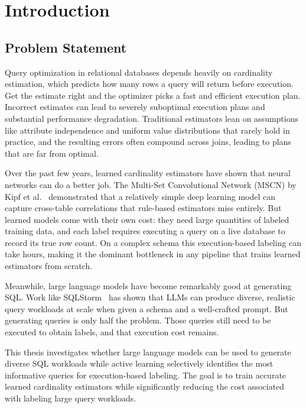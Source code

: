 
\chapter{Introduction}
\label{chap:introduction}
\pagestyle{plain}
\setcounter{page}{1}

\section{Problem Statement}

Query optimization in relational databases depends heavily on cardinality estimation, which predicts how many rows a query will return before execution. Get the estimate right and the optimizer picks a fast and efficient execution plan. Incorrect estimates can lead to severely suboptimal execution plans and substantial performance degradation. Traditional estimators lean on assumptions like attribute independence and uniform value distributions that rarely hold in practice, and the resulting errors often compound across joins, leading to plans that are far from optimal.

Over the past few years, learned cardinality estimators have shown that neural networks can do a better job. The Multi-Set Convolutional Network (MSCN) by Kipf et al.~\cite{DBLP:conf/cidr/KipfKRLBK19} demonstrated that a relatively simple deep learning model can capture cross-table correlations that rule-based estimators miss entirely. But learned models come with their own cost: they need large quantities of labeled training data, and each label requires executing a query on a live database to record its true row count. On a complex schema this execution-based labeling can take hours, making it the dominant bottleneck in any pipeline that trains learned estimators from scratch.

Meanwhile, large language models have become remarkably good at generating SQL. Work like SQLStorm~\cite{DBLP:journals/pvldb/SchmidtLBN25} has shown that LLMs can produce diverse, realistic query workloads at scale when given a schema and a well-crafted prompt. But generating queries is only half the problem. Those queries still need to be executed to obtain labels, and that execution cost remains.

This thesis investigates whether large language models can be used to generate diverse SQL workloads while active learning selectively identifies the most informative queries for execution-based labeling. The goal is to train accurate learned cardinality estimators while significantly reducing the cost associated with labeling large query workloads.

